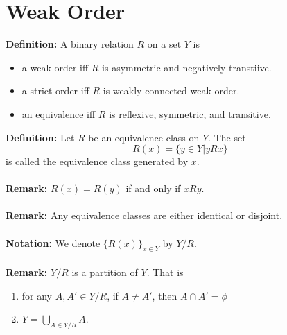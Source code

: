 \documentclass[10pt,a4paper,oneside]{article}
\begin{document}
\section{Weak Order}
{\bf Definition:} A binary relation $R$ on a set $Y$ is
	\begin{itemize}
		\item a weak order iff $R$ is asymmetric and negatively transtiive.
		\item a strict order iff $R$ is weakly connected weak order.
		\item an equivalence iff $R$ is reflexive, symmetric, and transitive.
	\end{itemize}
{\bf Definition:} Let $R$ be an equivalence class on $Y$. The set $$R(x)=\{y \in Y |yRx\}$$
	\hspace{12ex} is called the equivalence class generated by $x$.\\ \\
{\bf Remark:} $R(x)=R(y)$ if and only if $xRy$.\\ \\
{\bf Remark:} Any equivalence classes are either identical or disjoint.\\ \\
{\bf Notation:} We denote $\{R(x)\}_{x \in Y}$ by $Y/R$.\\ \\
{\bf Remark:} $Y/R$ is a partition of $Y$. That is
	\begin{enumerate}[label=(\roman*)]
	\item for any $A, A' \in Y/R$, if $A \neq A'$, then $A \cap A'=\phi$
	\item $Y=\bigcup_{A \in Y/R} A$.
	\end{enumerate}
\end{document}
